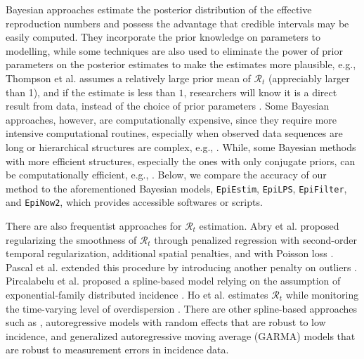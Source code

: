 \documentclass[10pt,letterpaper]{article}
\def\EpiEstim{\texttt{EpiEstim}}
\def\EpiLPS{\texttt{EpiLPS}}
\def\EpiFilter{\texttt{EpiFilter}}
\def\EpiNow2{\texttt{EpiNow2}}
\def\calR{\mathcal{R}}
\newcommand{\citep}[1]{\cite{#1}}
\begin{document}
Bayesian approaches estimate the posterior distribution of the effective
reproduction numbers and possess the advantage that credible intervals may be
easily computed. They incorporate the prior knowledge on parameters to 
modelling, while some techniques are also used to eliminate the power of prior parameters on 
the posterior estimates to make the estimates more plausible, e.g., 
Thompson et al. assumes a relatively large prior mean of $\calR_t$ 
(appreciably larger than 1), and if the estimate is less than $1$, researchers will 
know it is a direct result from data, instead of the choice of prior parameters \citep{thompson2019improved}.
Some Bayesian approaches, however, are computationally expensive, since they 
require more intensive computational routines, especially when observed
data sequences are long or hierarchical structures are complex, e.g., 
\cite{abbott2020estimating}. While, some Bayesian methods with more efficient structures, 
especially the ones with only conjugate priors, can be computationally efficient,
e.g., \cite{cori2013new}. Below, we compare the accuracy of our method to the aforementioned Bayesian models,
\EpiEstim, \EpiLPS, \EpiFilter, and \EpiNow2, which provides accessible softwares or scripts. 


There are also frequentist approaches for $\calR_t$ estimation.
Abry et al. proposed regularizing the smoothness of $\calR_t$ through
penalized regression with second-order temporal regularization, additional
spatial penalties, and with Poisson loss \citep{abry2020spatial}. Pascal et al. extended
this procedure by introducing another penalty on outliers \citep{pascal2022nonsmooth}.
Pircalabelu et al. proposed a spline-based model relying on the
assumption of exponential-family distributed incidence \citep{pircalabelu2023spline}. 
Ho et al. estimates $\calR_t$ while monitoring the time-varying level of overdispersion \citep{ho2023accounting}.
There are other spline-based approaches such as
\cite{azmon2014estimation,gressani2021approximate}, autoregressive models with
random effects \citep{jin2023epimix} that are robust to low incidence, and
generalized autoregressive moving average (GARMA) models
\citep{hettinger2023estimating} that are robust to measurement errors in
incidence data. 
\end{document}
